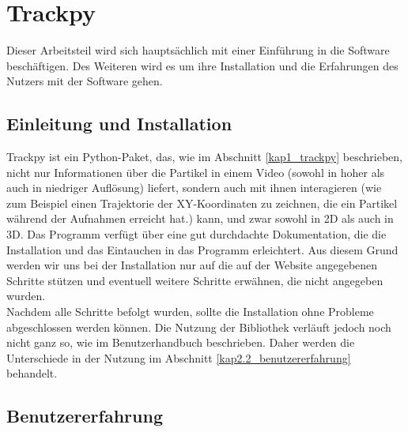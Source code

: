 \chapter{Trackpy \label{kap2}}

Dieser Arbeitsteil  wird sich hauptsächlich mit einer Einführung in die Software beschäftigen. Des Weiteren wird es um ihre Installation und die Erfahrungen des Nutzers mit der Software gehen.

\section{Einleitung und Installation \label{Kap2.1_Einleitung_Installation}}
Trackpy ist ein Python-Paket, das, wie im Abschnitt \ref{kap1_trackpy} beschrieben, nicht nur Informationen über die Partikel in einem Video (sowohl in hoher als auch in niedriger Auflösung) liefert, sondern auch mit ihnen interagieren (wie zum Beispiel einen Trajektorie der XY-Koordinaten zu zeichnen, die ein Partikel während der Aufnahmen erreicht hat.) kann, und zwar sowohl in 2D als auch in 3D. Das Programm verfügt über eine gut durchdachte Dokumentation, die die Installation und das Eintauchen in das Programm erleichtert.
Aus diesem Grund werden wir uns bei der Installation nur auf die auf der Website \cite{tp_installation} angegebenen Schritte stützen und eventuell weitere Schritte erwähnen, die nicht angegeben wurden.\\
Nachdem alle Schritte befolgt wurden, sollte die Installation ohne Probleme abgeschlossen werden können. Die Nutzung der Bibliothek verläuft jedoch noch nicht ganz so, wie im Benutzerhandbuch beschrieben. Daher werden die Unterschiede in der Nutzung im Abschnitt \ref{kap2.2_benutzererfahrung} behandelt.


\section{Benutzererfahrung \label{kap2.2_benutzererfahrung}}

